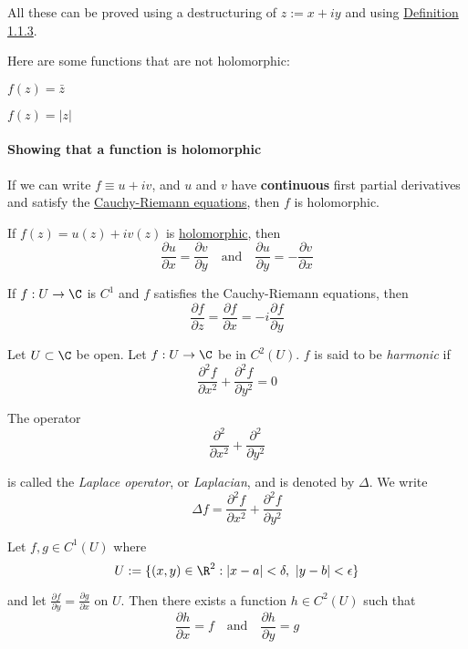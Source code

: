 All these can be proved using a destructuring of $z:=x+iy$ and using
\href{ffea0ed}{Definition 1.1.3}.

Here are some functions that are not holomorphic:
\begin{enumerati}
  \item $f(z)=\bar z$
  \item $f(z)=|z|$
\end{enumerati}

\paragraph{Showing that a function is holomorphic}

If we can write $f\equiv u+iv$, and $u$ and $v$ have \textbf{continuous} first
partial derivatives and satisfy the \href{fb10fd3}{Cauchy-Riemann equations},
then $f$ is holomorphic.

\label{fb10fd3}

If $f(z) = u(z) + iv(z)$ is \href{e1e08f7}{holomorphic}, then
$$
  \frac{\partial u}{\partial x}=\frac{\partial v}{\partial y}
  \quad\text{and}\quad
  \frac{\partial u}{\partial y}=-\frac{\partial v}{\partial x}
$$

\label{d507f47}

If $f:U\to\C$ is $C^1$ and $f$ satisfies the Cauchy-Riemann equations, then
$$
  \frac{\partial f}{\partial z}=\frac{\partial f}{\partial x}=
  -i\frac{\partial f}{\partial y}
$$

\label{d53f60f}

Let $U\subset\C$ be open. Let $f:U\to\C$ be in $C^2(U)$. $f$ is said to be
\textit{harmonic} if
$$
  \frac{\partial^2f}{\partial x^2}+\frac{\partial^2f}{\partial y^2}=0
$$

The operator
$$
  \frac{\partial^2}{\partial x^2}+\frac{\partial^2}{\partial y^2}
$$

is called the \textit{Laplace operator}, or \textit{Laplacian}, and is denoted
by $\Delta$. We write
$$
  \Delta f=\frac{\partial^2f}{\partial x^2}+\frac{\partial^2f}{\partial y^2}
$$

\label{fdd4521}

Let $f,g\in C^1(U)$ where
$$
  U:=\{ (x,y)\in\R^2:|x-a|<\delta,\ |y-b|<\epsilon \}
$$

and let $\displaystyle\frac{\partial f}{\partial y}=\frac{\partial g}{\partial
  x}$ on $U$. Then there exists a function $h\in C^2(U)$ such that
$$
  \frac{\partial h}{\partial x}=f
  \quad\text{and}\quad
  \frac{\partial h}{\partial y}=g
$$

